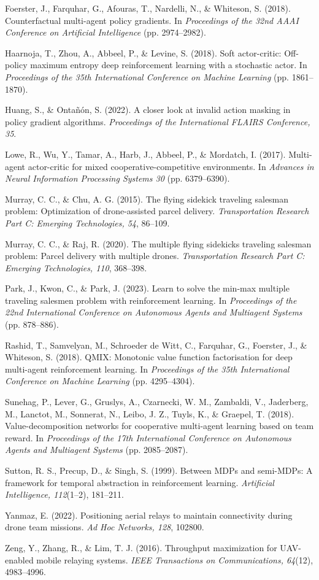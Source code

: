 \documentclass[12pt]{article}
\begin{document}
\noindent Foerster, J., Farquhar, G., Afouras, T., Nardelli, N., \& Whiteson, S. (2018).
Counterfactual multi-agent policy gradients. In \textit{Proceedings of the 32nd AAAI Conference
on Artificial Intelligence} (pp. 2974--2982).

\noindent Haarnoja, T., Zhou, A., Abbeel, P., \& Levine, S. (2018). Soft actor-critic: Off-policy
maximum entropy deep reinforcement learning with a stochastic actor. In \textit{Proceedings of the
35th International Conference on Machine Learning} (pp. 1861--1870).

\noindent Huang, S., \& Onta\~{n}\'{o}n, S. (2022). A closer look at invalid action masking in policy
gradient algorithms. \textit{Proceedings of the International FLAIRS Conference, 35}.

\noindent Lowe, R., Wu, Y., Tamar, A., Harb, J., Abbeel, P., \& Mordatch, I. (2017). Multi-agent
actor-critic for mixed cooperative-competitive environments. In \textit{Advances in Neural
Information Processing Systems 30} (pp. 6379--6390).

\noindent Murray, C. C., \& Chu, A. G. (2015). The flying sidekick traveling salesman problem:
Optimization of drone-assisted parcel delivery. \textit{Transportation Research Part C: Emerging
Technologies, 54}, 86--109.

\noindent Murray, C. C., \& Raj, R. (2020). The multiple flying sidekicks traveling salesman
problem: Parcel delivery with multiple drones. \textit{Transportation Research Part C: Emerging
Technologies, 110}, 368--398.

\noindent Park, J., Kwon, C., \& Park, J. (2023). Learn to solve the min-max multiple traveling
salesmen problem with reinforcement learning. In \textit{Proceedings of the 22nd International
Conference on Autonomous Agents and Multiagent Systems} (pp. 878--886).

\noindent Rashid, T., Samvelyan, M., Schroeder de Witt, C., Farquhar, G., Foerster, J., \&
Whiteson, S. (2018). QMIX: Monotonic value function factorisation for deep multi-agent
reinforcement learning. In \textit{Proceedings of the 35th International Conference on Machine
Learning} (pp. 4295--4304).

\noindent Sunehag, P., Lever, G., Gruslys, A., Czarnecki, W. M., Zambaldi, V., Jaderberg, M.,
Lanctot, M., Sonnerat, N., Leibo, J. Z., Tuyls, K., \& Graepel, T. (2018). Value-decomposition
networks for cooperative multi-agent learning based on team reward. In \textit{Proceedings of
the 17th International Conference on Autonomous Agents and Multiagent Systems} (pp. 2085--2087).

\noindent Sutton, R. S., Precup, D., \& Singh, S. (1999). Between MDPs and semi-MDPs: A framework
for temporal abstraction in reinforcement learning. \textit{Artificial Intelligence, 112}(1--2),
181--211.

\noindent Yanmaz, E. (2022). Positioning aerial relays to maintain connectivity during drone team
missions. \textit{Ad Hoc Networks, 128}, 102800.

\noindent Zeng, Y., Zhang, R., \& Lim, T. J. (2016). Throughput maximization for UAV-enabled mobile
relaying systems. \textit{IEEE Transactions on Communications, 64}(12), 4983--4996.
\end{document}
